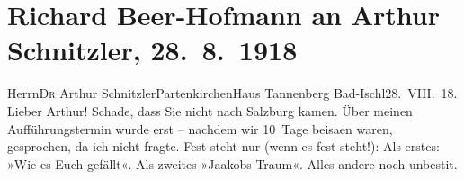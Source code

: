 

         
         \newcommand{\erwaehntePersonen}{Personen: Olga Schnitzler, Elisabeth Steinrück, Albert Steinrück}
         \newcommand{\erwaehnteOrte}{Orte: Bad Ischl, Garmisch-Partenkirchen, Haus Tannenberg, Partenkirchen, Salzburg, Wien}
         \newcommand{\erwaehnteWerke}{Werke: Jaákobs Traum. Ein Vorspiel, Wie es euch gefällt}
               \section[Richard Beer-Hofmann an Arthur Schnitzler, 28. 8. 1918]{ Richard Beer-Hofmann an Arthur Schnitzler,
               28. 8. 1918}\nopagebreak{}\rehead{ }\begin{ledgroupsized}[t]{13cm}\normalsize\beginnumbering \toendnotes[C]{\smallbreak\pagebreak[2]} 
\toendnotes[C]{\smallbreak}\pstart{}{\pb}Herrn\pend{}\pstart{}D\textsc{r} Arthur Schnitzler\pend{}\pstart{}Partenkirchen\pend{}\pstart{}Haus Tannenberg\pend{}{\bigskip}\pstart
           \raggedleft{}{\pb}Bad-Ischl28. VIII. 18.\pend
           \pstart
           Lieber Arthur! Schade, dass Sie nicht nach Salzburg kamen. Über meinen Aufführungstermin wurde erst –
               nachdem wir 10 Tage beisa{\geminationm}en waren, gesprochen, da ich
               nicht fragte. Fest steht  nur \introOben{}(wenn es fest steht!\introOben{}): Als erstes: »Wie es
                  Euch gefällt«. Als zweites »Jaakobs
               Traum«. Alles andere noch unbesti{\geminationm}t.

\end{ledgroupsized}
